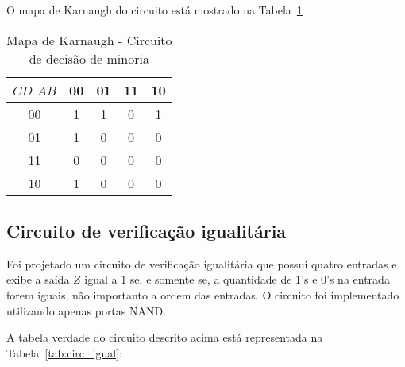\documentclass[12pt]{article}
\begin{document}
O mapa de Karnaugh do circuito está mostrado na Tabela~\ref{tab:k_map_circ_minoria}

\begin{table}[H]
    \centering
    \caption{Mapa de Karnaugh - Circuito de decisão de minoria}

    \begin{tabular}{|c|c|c|c|c|}
    \hline
    $C$$D$ $A$$B$ & 00 & 01 & 11 & 10\\
    \hline
    00 & 1 & 1 & 0 & 1\\
    \hline
    01 & 1 & 0 & 0 & 0\\
    \hline
    11 & 0 & 0 & 0 & 0\\
    \hline
    10 & 1 & 0 & 0 & 0\\
    \hline
    \end{tabular}
    \label{tab:k_map_circ_minoria}
\end{table}


\subsection{Circuito de verificação igualitária}
\label{CIgual}

Foi projetado um circuito de verificação igualitária que possui quatro entradas e exibe a saída $Z$ igual a 1 se, e somente se, a quantidade de 1's e 0's na entrada forem iguais, não importanto a ordem das entradas. O circuito foi implementado utilizando apenas portas NAND.

A tabela verdade do circuito descrito acima está representada na Tabela~\ref{tab:circ_igual}:
\end{document}
